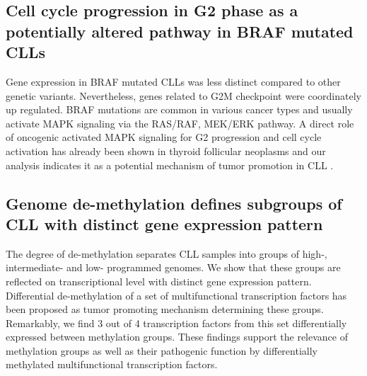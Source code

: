 \subsection{Cell cycle progression in G2 phase as a potentially altered pathway in BRAF mutated CLLs}
Gene expression in BRAF mutated CLLs was less distinct compared to other genetic variants. Nevertheless, genes related to G2M checkpoint were coordinately up regulated. BRAF mutations are common in various cancer types and usually activate MAPK signaling via the RAS/RAF, MEK/ERK pathway. A direct role of oncogenic activated MAPK signaling for G2 progression and cell cycle activation has already been shown in thyroid follicular neoplasms and our analysis indicates it as a potential mechanism of tumor promotion in CLL \citep{Knauf2006}.

\subsection{Genome de-methylation defines subgroups of CLL with distinct gene expression pattern}
The degree of de-methylation separates CLL samples into groups of high-, intermediate- and low- programmed genomes. We show that these groups are reflected on transcriptional level with distinct gene expression pattern. Differential de-methylation of a set of multifunctional transcription factors has been proposed as tumor promoting mechanism determining these groups. Remarkably, we find 3 out of 4 transcription factors from this set differentially expressed between methylation groups. These findings support the relevance of methylation groups as well as their pathogenic function by differentially methylated multifunctional transcription factors. 


